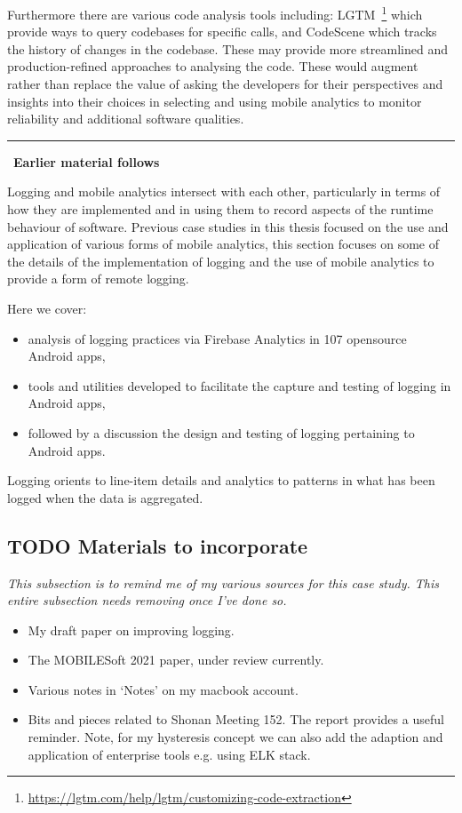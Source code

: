 Furthermore there are various code analysis tools including: LGTM~\footnote{\url{https://lgtm.com/help/lgtm/customizing-code-extraction}} which provide ways to query codebases for specific calls, and CodeScene which tracks the history of changes in the codebase. These may provide more streamlined and production-refined approaches to analysing the code. These would augment rather than replace the value of asking the developers for their perspectives and insights into their choices in selecting and using mobile analytics to monitor reliability and additional software qualities. 


\par\noindent\rule{\textwidth}{0.4pt}
~\textbf{Earlier material follows}

Logging and mobile analytics intersect with each other, particularly in terms of how they are implemented and in using them to record aspects of the runtime behaviour of software. Previous case studies in this thesis focused on the use and application of various forms of mobile analytics, this section focuses on some of the details of the implementation of logging and the use of mobile analytics to provide a form of remote logging. 

Here we cover:
\begin{itemize}
    \item analysis of logging practices via Firebase Analytics in 107 opensource Android apps,
    \item tools and utilities developed to facilitate the capture and testing of logging in Android apps,
    \item followed by a discussion the design and testing of logging pertaining to Android apps.
\end{itemize}

Logging orients to line-item details and analytics to patterns in what has been logged when the data is aggregated.

\subsection{TODO Materials to incorporate}
\textit{This subsection is to remind me of my various sources for this case study. This entire subsection needs removing once I've done so.}
\begin{itemize}
    \item My draft paper on improving logging.
    \item The MOBILESoft 2021 paper, under review currently.
    \item Various notes in `Notes' on my macbook account.
    \item Bits and pieces related to Shonan Meeting 152. The report provides a useful reminder. Note, for my hysteresis concept we can also add the adaption and application of enterprise tools e.g. using ELK stack.  
\end{itemize}

